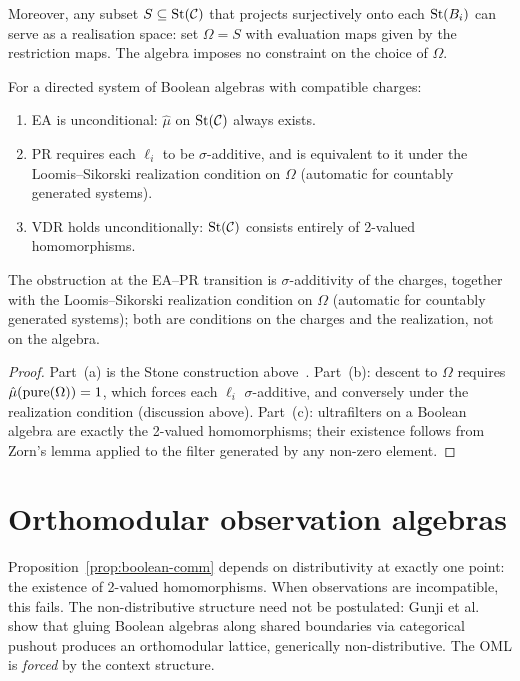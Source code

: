 Moreover, any subset $S \subseteq \mathrm{St}(\mathcal{C})$ that projects
surjectively onto each $\mathrm{St}(B_i)$ can serve as a realisation space:
set $\Omega = S$ with evaluation maps given by the restriction maps.
The algebra imposes no constraint on the choice of $\Omega$.

\begin{proposition}
\label{prop:boolean-comm}
For a directed system of Boolean algebras with compatible charges:
\begin{enumerate}[label=(\alph*)]
  \item EA is unconditional: $\hat{\mu}$ on $\mathrm{St}(\mathcal{C})$
    always exists.
  \item PR requires each $\ell_i$ to be $\sigma$-additive, and is
    equivalent to it under the Loomis--Sikorski realization condition
    on $\Omega$ (automatic for countably generated systems).
  \item VDR holds unconditionally: $\mathrm{St}(\mathcal{C})$ consists
    entirely of 2-valued homomorphisms.
\end{enumerate}
The obstruction at the EA--PR transition is $\sigma$-additivity of the
charges, together with the Loomis--Sikorski realization condition on
$\Omega$ (automatic for countably generated systems); both are
conditions on the charges and the realization, not on the algebra.
\end{proposition}

\begin{proof}
Part~(a) is the Stone construction above~\cite{rao1983, choksi1958}.
Part~(b): descent to $\Omega$ requires $\hat\mu(\mathrm{pure}(\Omega)) = 1$,
which forces each $\ell_i$ $\sigma$-additive, and conversely under the
realization condition (discussion above).  Part~(c): ultrafilters on
a Boolean algebra are exactly the 2-valued homomorphisms; their
existence follows from Zorn's lemma applied to the filter generated
by any non-zero element.
\end{proof}

\section{Orthomodular observation algebras}
\label{sec:oml}

Proposition~\ref{prop:boolean-comm} depends on distributivity at
exactly one point: the existence of 2-valued homomorphisms.  When
observations are incompatible, this fails.  The non-distributive
structure need not be postulated: Gunji et
al.~\cite{Gunji2026} show that gluing Boolean algebras along
shared boundaries via categorical pushout produces an orthomodular
lattice, generically non-distributive.  The OML is \emph{forced}
by the context structure.


